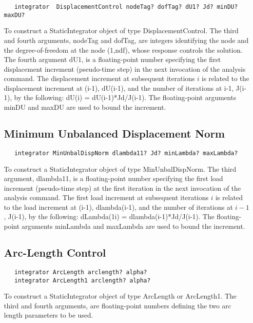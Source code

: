 \documentclass[12pt]{article}
\begin{document}
{\sf\small
\begin{verbatim}
   integrator  DisplacementControl nodeTag? dofTag? dU1? Jd? minDU? maxDU?
\end{verbatim}
}

To construct a StaticIntegrator object of type DisplacementControl. The third
and fourth arguments, nodeTag and dofTag, are integers identifying the
node and the degree-of-freedom at the node (1,ndf), whose response
controls the solution. The fourth argument dU1, is a floating-point
number specifying the first displacement increment (pseudo-time step)
in the next invocation of the analysis command. The displacement
increment at subsequent iterations $i$ is related to the displacement
increment at (i-1), dU(i-1), and the number of iterations at i-1,
J(i-1), by the following: dU(i) = dU(i-1)*Jd/J(i-1). The
floating-point arguments minDU and maxDU are used to bound the
increment.

\subsection{Minimum Unbalanced Displacement Norm}

{\sf\small
\begin{verbatim}
   integrator MinUnbalDispNorm dlambda11? Jd? minLambda? maxLambda?
\end{verbatim}
}

To construct a StaticIntegrator object of type MinUnbalDispNorm. The third
argument, dlambda11, is a floating-point number specifying the first
load increment (pseudo-time step) at the first iteration in the next
invocation of the analysis command. The first load increment at subsequent
iterations $i$ is related to the load increment at (i-1),
dlambda(i-1), and the number of iterations at $i-1$, J(i-1), by the
following: dLambda(1i) = dlambda(i-1)*Jd/J(i-1). The floating-point
arguments minLambda and maxLambda are used to bound the increment.

\subsection{Arc-Length Control}

{\sf\small
\begin{verbatim}
   integrator ArcLength arclength? alpha?
   integrator ArcLength1 arclength? alpha?
\end{verbatim}
}

To construct a StaticIntegrator object of type ArcLength or
ArcLength1. The third and fourth arguments, are floating-point numbers
defining the two arc length parameters to be used.
\end{document}
